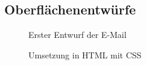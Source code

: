 \subsection{Oberflächenentwürfe}
\label{app:Entwuerfe}
\begin{figure}[htb]
\centering
{}
\caption{Erster Entwurf der E-Mail}
\end{figure}

\begin{figure}[htb]
\centering
{}
\caption{Umsetzung in HTML mit CSS}
\end{figure}